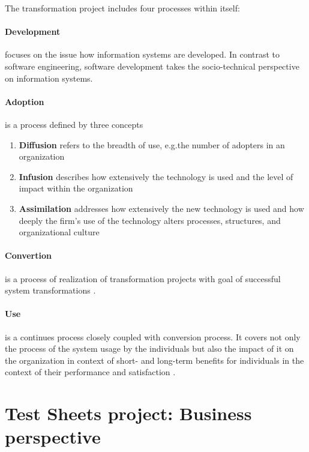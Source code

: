 The transformation project includes four processes within itself:
\paragraph{Development} focuses on the issue how information systems are developed. In contrast to software engineering, software development takes the socio-technical perspective on information systems\cite{MES6}.

\paragraph{Adoption} is a process defined by three concepts\cite{MES7}
\begin{enumerate}
	\item \textbf{Diffusion} refers to the breadth of use, e.g.the number of adopters in an organization
	\item \textbf{Infusion} describes how extensively the technology is used and the level of impact within the organization
	\item \textbf{Assimilation} addresses how extensively the new technology is used and how deeply the firm's use of the technology alters processes, structures, and organizational culture
\end{enumerate}

\paragraph{Convertion} is a process of realization of transformation projects with goal of successful system transformations \cite{MES9}.

\paragraph{Use} is a continues process closely coupled with conversion process. It covers not only the process of the system usage by the individuals but also the impact of it on the organization in context of short- and long-term benefits for individuals in the context of their performance and satisfaction \cite{MES9}.

\section{Test Sheets project: Business perspective}




